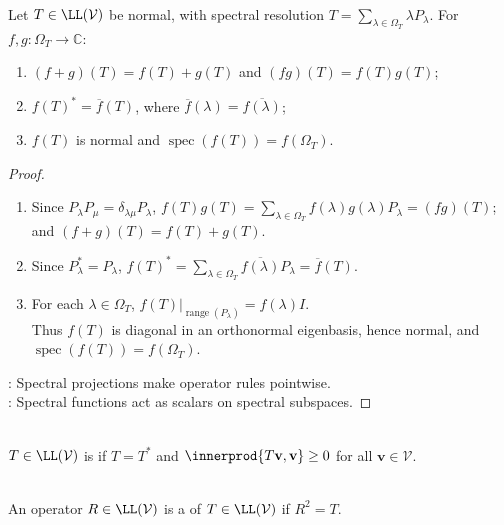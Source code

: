 \begin{theorem} \label{thm:normal-spectral-functional-calculus-rules} \\
Let $T\in\LL(\mathcal{V})$ be normal, with spectral resolution $T=\sum\limits_{\lambda\in\Omega_T}\lambda P_{\lambda}$. For $f,g:\Omega_T\to\mathbb{C}$:
\begin{enumerate}[label=(\roman*)]
\setlength{\itemsep}{0pt}
\item $(f+g)(T)=f(T)+g(T)$ and $(fg)(T)=f(T)g(T)$;
\item $f(T)^*=\overline{f}(T)$, where $\overline{f}(\lambda)=\overline{f(\lambda)}$;
\item $f(T)$ is normal and $\operatorname{spec}(f(T))=f(\Omega_T)$.
\end{enumerate}
\begin{proof}
\begin{enumerate}[label=(\roman*)]
\setlength{\itemsep}{0pt}
\item Since $P_{\lambda}P_{\mu}=\delta_{\lambda\mu}P_{\lambda}$, $f(T)g(T)=\sum\limits_{\lambda\in\Omega_T}f(\lambda)g(\lambda)P_{\lambda}=(fg)(T)$; and $(f+g)(T)=f(T)+g(T)$.
\item Since $P_{\lambda}^*=P_{\lambda}$, $f(T)^*=\sum\limits_{\lambda\in\Omega_T}\overline{f(\lambda)}P_{\lambda}=\overline{f}(T)$.
\item For each $\lambda\in\Omega_T$, $f(T)|_{\operatorname{range}(P_{\lambda})}=f(\lambda)I$.\\
Thus $f(T)$ is diagonal in an orthonormal eigenbasis, hence normal, and $\operatorname{spec}(f(T))=f(\Omega_T)$.
\end{enumerate}
: Spectral projections make operator rules pointwise.\\
: Spectral functions act as scalars on spectral subspaces.
\end{proof}
\end{theorem}

\begin{definition} \label{def:positive-operator} \\
$T\in\LL(\mathcal{V})$ is  if $T=T^*$ and $\innerprod{T\mathbf{v},\mathbf{v}}\geq0$ for all $\mathbf{v}\in\mathcal{V}$.
\end{definition}

\begin{definition} \label{def:square-root-operator} \\
An operator $R\in\LL(\mathcal{V})$ is a  of $T\in\LL(\mathcal{V})$ if $R^2=T$.
\end{definition}

